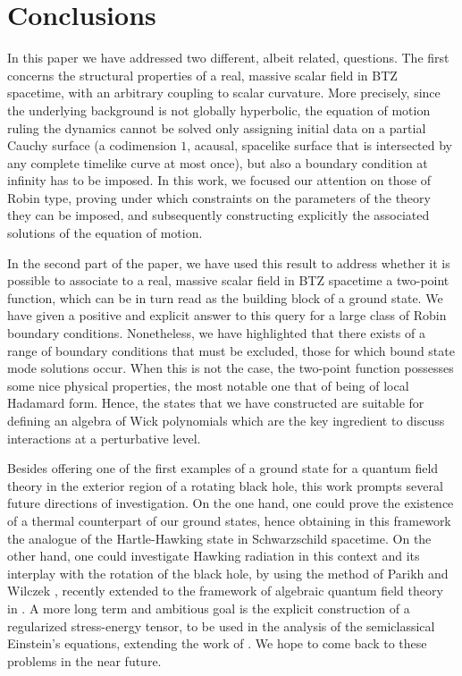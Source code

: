 \documentclass[aps, prd, amsmath, floats, floatfix, twocolumn, nofootinbib, superscriptaddress, showpacs]{revtex4-1}
\begin{document}

\section{Conclusions}
\label{sec:conclusions}

In this paper we have addressed two different, albeit related, questions. The first concerns the structural properties of a real, massive scalar field in BTZ spacetime, with an arbitrary coupling to scalar curvature. More precisely, since the underlying background is not globally hyperbolic, the equation of motion ruling the dynamics cannot be solved only assigning initial data on a partial Cauchy surface (a codimension $1$, acausal, spacelike surface that is intersected by any complete timelike curve at most once), but also a boundary condition at infinity has to be imposed. In this work, we focused our attention on those of Robin type, proving under which constraints on the parameters of the theory they can be imposed, and subsequently constructing explicitly the associated solutions of the equation of motion. 

In the second part of the paper, we have used this result to address whether it is possible to associate to a real, massive scalar field in BTZ spacetime a two-point function, which can be in turn read as the building block of a ground state. We have given a positive and explicit answer to this query for a large class of Robin boundary conditions. Nonetheless, we have highlighted that there exists of a range of boundary conditions that must be excluded, those for which bound state mode solutions occur. When this is not the case, the two-point function possesses some nice physical properties, the most notable one that of being of local Hadamard form. Hence, the states that we have constructed are suitable for defining an algebra of Wick polynomials which are the key ingredient to discuss interactions at a perturbative level. 

Besides offering one of the first examples of a ground state for a quantum field theory in the exterior region of a rotating black hole, this work prompts several future directions of investigation. On the one hand, one could prove the existence of a thermal counterpart of our ground states, hence obtaining in this framework the analogue of the Hartle-Hawking state in Schwarzschild spacetime. On the other hand, one could investigate Hawking radiation in this context and its interplay with the rotation of the black hole, by using the method of Parikh and Wilczek \cite{Parikh:1999mf}, recently extended to the framework of algebraic quantum field theory in \cite{Moretti:2010qd}. A more long term and ambitious goal is the explicit construction of a regularized stress-energy tensor, to be used in the analysis of the semiclassical Einstein's equations, extending the work of \cite{Binosi:1998yu}. We hope to come back to these problems in the near future.
\end{document}
